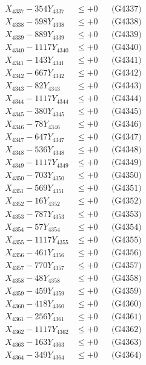 \documentclass[a4paper,10pt]{article}
\begin{document}
{\begin{align}
X_{4337} - 354Y_{4337} &\leq +0 && \text{(G4337)} \\
X_{4338} - 598Y_{4338} &\leq +0 && \text{(G4338)} \\
X_{4339} - 889Y_{4339} &\leq +0 && \text{(G4339)} \\
X_{4340} - 1117Y_{4340} &\leq +0 && \text{(G4340)} \\
\allowbreak
X_{4341} - 143Y_{4341} &\leq +0 && \text{(G4341)} \\
X_{4342} - 667Y_{4342} &\leq +0 && \text{(G4342)} \\
X_{4343} - 82Y_{4343} &\leq +0 && \text{(G4343)} \\
X_{4344} - 1117Y_{4344} &\leq +0 && \text{(G4344)} \\
X_{4345} - 380Y_{4345} &\leq +0 && \text{(G4345)} \\
X_{4346} - 78Y_{4346} &\leq +0 && \text{(G4346)} \\
X_{4347} - 647Y_{4347} &\leq +0 && \text{(G4347)} \\
X_{4348} - 536Y_{4348} &\leq +0 && \text{(G4348)} \\
X_{4349} - 1117Y_{4349} &\leq +0 && \text{(G4349)} \\
X_{4350} - 703Y_{4350} &\leq +0 && \text{(G4350)} \\
\allowbreak
X_{4351} - 569Y_{4351} &\leq +0 && \text{(G4351)} \\
X_{4352} - 16Y_{4352} &\leq +0 && \text{(G4352)} \\
X_{4353} - 787Y_{4353} &\leq +0 && \text{(G4353)} \\
X_{4354} - 57Y_{4354} &\leq +0 && \text{(G4354)} \\
X_{4355} - 1117Y_{4355} &\leq +0 && \text{(G4355)} \\
X_{4356} - 461Y_{4356} &\leq +0 && \text{(G4356)} \\
X_{4357} - 770Y_{4357} &\leq +0 && \text{(G4357)} \\
X_{4358} - 48Y_{4358} &\leq +0 && \text{(G4358)} \\
X_{4359} - 459Y_{4359} &\leq +0 && \text{(G4359)} \\
X_{4360} - 418Y_{4360} &\leq +0 && \text{(G4360)} \\
\allowbreak
X_{4361} - 256Y_{4361} &\leq +0 && \text{(G4361)} \\
X_{4362} - 1117Y_{4362} &\leq +0 && \text{(G4362)} \\
X_{4363} - 163Y_{4363} &\leq +0 && \text{(G4363)} \\
X_{4364} - 349Y_{4364} &\leq +0 && \text{(G4364)} \\

\end{align}}
\end{document}
